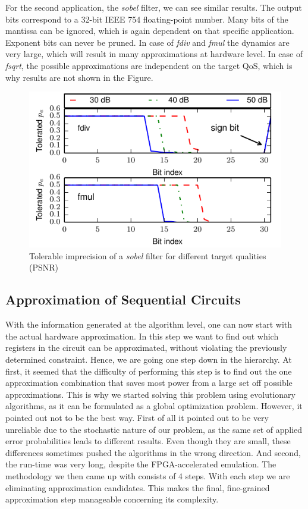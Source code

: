 \documentclass[10pt,twocolumn]{IEEEtran} %
\begin{document}
For the second application, the \emph{sobel} filter, we can see similar results. The output bits correspond to a 32-bit IEEE 754 floating-point number. Many bits of the mantissa can be ignored, which is again dependent on that specific application. Exponent bits can never be pruned. In case of \emph{fdiv} and \emph{fmul} the dynamics are very large, which will result in many approximations at hardware level. In case of \emph{fsqrt}, the possible approximations are independent on the target QoS, which is why results are not shown in the Figure.
\begin{figure}[tb]
  \centering
  \includegraphics[width=.48\textwidth]{figs/metrics_sobel}
  \caption{Tolerable imprecision of a \emph{sobel} filter for different target qualities (PSNR)}
  \label{fig:metrics_sobel}
\end{figure}


\subsection{\bf{Approximation of Sequential Circuits}}
\label{subsec:approximation}
With the information generated at the algorithm level, one can now start with the actual hardware approximation. In this step we want to find out which registers in the circuit can be approximated, without violating the previously determined constraint. Hence, we are going one step down in the hierarchy. At first, it seemed that the difficulty of performing this step is to find out the one approximation combination that saves most power from a large set off possible approximations. This is why we started solving this problem using evolutionary algorithms, as it can be formulated as a global optimization problem. However, it pointed out not to be the best way. First of all it pointed out to be very unreliable due to the stochastic nature of our problem, as the same set of applied error probabilities leads to different results. Even though they are small, these differences sometimes pushed the algorithms in the wrong direction. And second, the run-time was very long, despite the FPGA-accelerated emulation. The methodology we then came up with consists of 4 steps. With each step we are eliminating approximation candidates. This makes the final, fine-grained approximation step manageable concerning its complexity.
\end{document}
